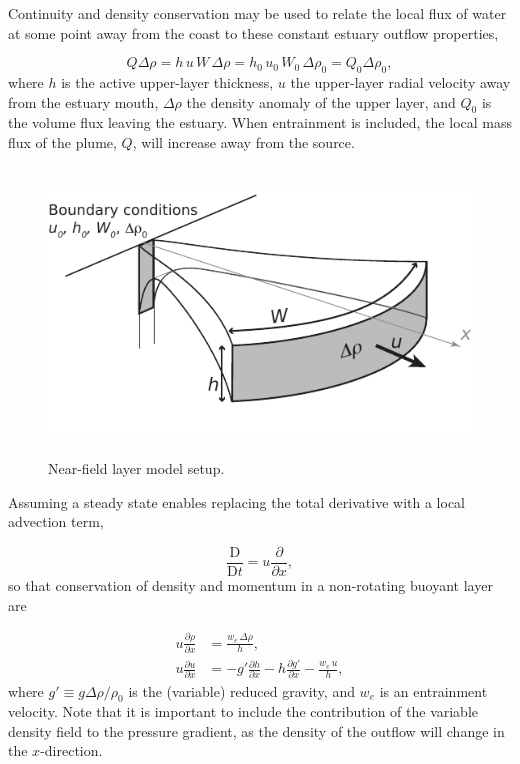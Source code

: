 \documentclass[11pt]{report}
\numberwithin{equation}{section}
\begin{document}
Continuity and density conservation may be used to relate the local flux of water at some point away from the coast to these constant estuary outflow properties,

\begin{equation}
Q \Delta\rho = h\,u\,W\,\Delta\rho = h_0\,u_0\,W_0\,\Delta\rho_0 = Q_0 \Delta\rho_0, \label{eq:mass}
\end{equation}
where $h$ is the active upper-layer thickness, $u$ the upper-layer radial velocity away from the estuary mouth, $\Delta\rho$ the density anomaly of the upper layer, and $Q_0$ is the volume flux leaving the estuary.  When entrainment is included, the local mass flux of the plume, $Q$, will increase away from the source.

\begin{figure}[htbp]
    \centering
        \includegraphics[height=3in]{layer_model_setup.pdf}
    \caption{Near-field layer model setup.}
    \label{fig:layer_model_setup}
\end{figure}

Assuming a steady state enables replacing the total derivative with a local advection term,

\begin{equation}
\frac{\mathrm{D}}{\mathrm{D} t} = u\frac{\partial}{\partial x},
\end{equation}
so that conservation of density and momentum in a non-rotating buoyant layer are

\begin{align}
u \frac{\partial \rho}{\partial x} &= \frac{w_e\,\Delta\rho}{h}, \label{eq:moment_full}\\
u \frac{\partial u}{\partial x} &=  -g' \frac{\partial h}{\partial x} - h \frac{\partial g'}{\partial x}- \frac{w_e\,u}{h}, \label{eq:density_full}
\end{align}
where $g' \equiv g \Delta\rho / \rho_0$ is the (variable) reduced gravity, and $w_e$ is an entrainment velocity.  Note that it is important to include the contribution of the variable density field to the pressure gradient, as the density of the outflow will change in the $x$-direction.  
\end{document}
